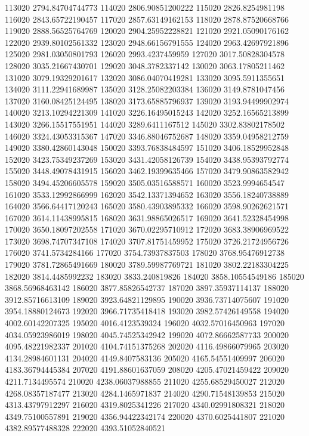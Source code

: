 {113020 2794.84704744773
114020 2806.90851200222
115020 2826.8254981198
116020 2843.65722190457
117020 2857.63149162153
118020 2878.87520668766
119020 2888.56525764769
120020 2904.25952228821
121020 2921.05090176162
122020 2939.80102561332
123020 2948.66156791555
124020 2963.42697921896
125020 2981.03050801793
126020 2993.4237459959
127020 3017.50828304578
128020 3035.21667430701
129020 3048.3782337142
130020 3063.17805211462
131020 3079.19329201617
132020 3086.04070419281
133020 3095.5911355651
134020 3111.22941689987
135020 3128.25082203384
136020 3149.8781047456
137020 3160.08425124495
138020 3173.65885796937
139020 3193.94499902974
140020 3213.10294221309
141020 3226.16495015243
142020 3252.16565213899
143020 3266.15517551951
144020 3289.6411167512
145020 3302.83802178502
146020 3324.43053315367
147020 3346.88046752687
148020 3359.04958212759
149020 3380.42860143048
150020 3393.76838484597
151020 3406.18529952848
152020 3423.75349237269
153020 3431.42058126739
154020 3438.95393792774
155020 3448.49078431915
156020 3462.19399635466
157020 3479.90863582942
158020 3494.45206605578
159020 3505.03516588571
160020 3523.9994654547
161020 3533.12992866999
162020 3542.13371394652
163020 3556.18240738889
164020 3566.64417120243
165020 3580.43903895332
166020 3598.90262621571
167020 3614.11438995815
168020 3631.98865026517
169020 3641.52328454998
170020 3650.18097202558
171020 3670.02295710912
172020 3683.38906969522
173020 3698.74707347108
174020 3707.81751459952
175020 3726.21724956726
176020 3741.5734284166
177020 3754.73937837503
178020 3768.95476912738
179020 3781.72865491669
180020 3789.59987769721
181020 3802.22183304225
182020 3814.4485992232
183020 3833.240819826
184020 3858.10554549186
185020 3868.56968463142
186020 3877.85826542737
187020 3897.35937114137
188020 3912.85716613109
189020 3923.64821129895
190020 3936.73714075607
191020 3954.18880124673
192020 3966.71735418418
193020 3982.57426149558
194020 4002.60142207325
195020 4016.4123539324
196020 4032.57016450963
197020 4034.05923986019
198020 4045.74525342942
199020 4072.86662587733
200020 4095.48221982337
201020 4104.74151375268
202020 4116.49866079965
203020 4134.28984601131
204020 4149.8407583136
205020 4165.54551409997
206020 4183.36794445384
207020 4191.88601637059
208020 4205.47021459422
209020 4211.7134495574
210020 4238.06037988855
211020 4255.68529450027
212020 4268.08357187477
213020 4284.1465971837
214020 4290.71548139853
215020 4313.43797912297
216020 4319.8025341226
217020 4340.02991808321
218020 4349.75100557891
219020 4356.94422342174
220020 4370.6025441807
221020 4382.89577488328
222020 4393.51052840521
}
